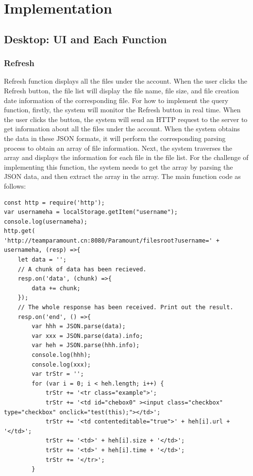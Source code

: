 \documentclass[11pt]{article}
\begin{document}
\clearpage
\section{Implementation}

\subsection{Desktop: UI and Each Function}

\subsubsection{Refresh}
Refresh function displays all the files under the account. When the user clicks the Refresh button, the file list will display the file name, file size, and file creation date information of the corresponding file. For how to implement the query function, firstly, the system will monitor the Refresh button in real time. When the user clicks the button, the system will send an HTTP request to the server to get information about all the files under the account. When the system obtains the data in these JSON formats, it will perform the corresponding parsing process to obtain an array of file information. Next, the system traverses the array and displays the information for each file in the file list. For the challenge of implementing this function, the system needs to get the array by parsing the JSON data, and then extract the array in the array. The main function code as follows:
\begin{lstlisting}
const http = require('http');
var usernameha = localStorage.getItem("username");
console.log(usernameha);
http.get(
'http://teamparamount.cn:8080/Paramount/filesroot?username=' + usernameha, (resp) =>{
	let data = '';
	// A chunk of data has been recieved.
	resp.on('data', (chunk) =>{
		data += chunk;
	});
	// The whole response has been received. Print out the result.
	resp.on('end', () =>{
		var hhh = JSON.parse(data);
		var xxx = JSON.parse(data).info;
		var heh = JSON.parse(hhh.info);
		console.log(hhh);
		console.log(xxx);
		var trStr = '';
		for (var i = 0; i < heh.length; i++) {
			trStr += '<tr class="example">';
			trStr += '<td id="chebox0" ><input class="checkbox" type="checkbox" onclick="test(this);"></td>';            
			trStr += '<td contenteditable="true">' + heh[i].url + '</td>';
			trStr += '<td>' + heh[i].size + '</td>';
			trStr += '<td>' + heh[i].time + '</td>';
			trStr += '</tr>';
		}
\end{lstlisting}
\end{document}

